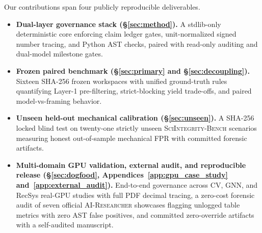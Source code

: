 Our contributions span four publicly reproducible deliverables.
\begin{itemize}[leftmargin=1.4em,itemsep=1.5pt,topsep=2pt]
  \item \textbf{Dual-layer governance stack (\S\ref{sec:method}).} A stdlib-only deterministic core enforcing claim ledger gates, unit-normalized signed number tracing, and Python AST checks, paired with read-only auditing and dual-model milestone gates.
  \item \textbf{Frozen paired benchmark (\S\ref{sec:primary} and \S\ref{sec:decoupling}).} Sixteen SHA-256 frozen workspaces with unified ground-truth rules quantifying Layer-1 pre-filtering, strict-blocking yield trade-offs, and paired model-vs-framing behavior.
  \item \textbf{Unseen held-out mechanical calibration (\S\ref{sec:unseen}).} A SHA-256 locked blind test on twenty-one strictly unseen \textsc{SciIntegrity-Bench} scenarios measuring honest out-of-sample mechanical FPR with committed forensic artifacts.
  \item \textbf{Multi-domain GPU validation, external audit, and reproducible release (\S\ref{sec:dogfood}, Appendices~\ref{app:gpu_case_study} and~\ref{app:external_audit}).} End-to-end governance across CV, GNN, and RecSys real-GPU studies with full PDF decimal tracing, a zero-cost forensic audit of seven official \textsc{AI-Researcher} showcases flagging unlogged table metrics with zero AST false positives, and committed zero-override artifacts with a self-audited manuscript.
\end{itemize}
